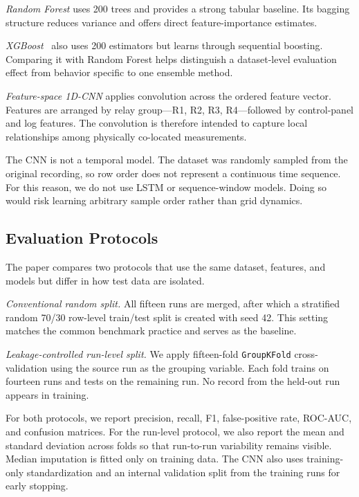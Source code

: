 \documentclass[conference,a4paper]{IEEEtran}
\begin{document}
\textit{Random Forest} uses 200 trees and provides a strong tabular baseline. Its bagging structure reduces variance and offers direct feature-importance estimates.

\textit{XGBoost}~\cite{chen2016xgboost} also uses 200 estimators but learns through sequential boosting. Comparing it with Random Forest helps distinguish a dataset-level evaluation effect from behavior specific to one ensemble method.

\textit{Feature-space 1D-CNN} applies convolution across the ordered feature vector. Features are arranged by relay group---R1, R2, R3, R4---followed by control-panel and log features. The convolution is therefore intended to capture local relationships among physically co-located measurements.

The CNN is not a temporal model. The dataset was randomly sampled from the original recording, so row order does not represent a continuous time sequence. For this reason, we do not use LSTM or sequence-window models. Doing so would risk learning arbitrary sample order rather than grid dynamics.

\subsection{Evaluation Protocols}

The paper compares two protocols that use the same dataset, features, and models but differ in how test data are isolated.

\textit{Conventional random split.} All fifteen runs are merged, after which a stratified random 70/30 row-level train/test split is created with seed 42. This setting matches the common benchmark practice and serves as the baseline.

\textit{Leakage-controlled run-level split.} We apply fifteen-fold \texttt{GroupKFold} cross-validation using the source run as the grouping variable. Each fold trains on fourteen runs and tests on the remaining run. No record from the held-out run appears in training.

For both protocols, we report precision, recall, F1, false-positive rate, ROC-AUC, and confusion matrices. For the run-level protocol, we also report the mean and standard deviation across folds so that run-to-run variability remains visible. Median imputation is fitted only on training data. The CNN also uses training-only standardization and an internal validation split from the training runs for early stopping.
\end{document}
